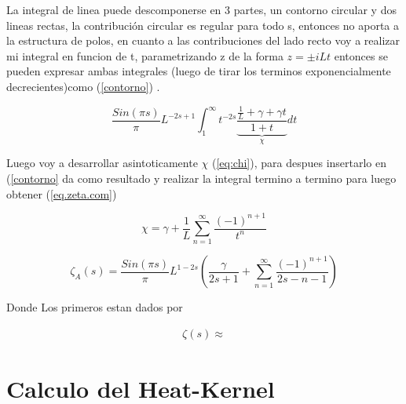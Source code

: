 La integral de linea puede descomponerse en 3 partes, un contorno circular y dos lineas rectas, la contribución circular es regular para todo s, entonces no aporta a la estructura de polos, en cuanto a las contribuciones del lado recto voy a realizar mi integral en funcion de t, parametrizando z de la forma $z = \pm i L t$ entonces se pueden expresar ambas integrales (luego de tirar los terminos exponencialmente decrecientes)como  (\ref{contorno}) .

\begin{equation}
    \frac{Sin(\pi s)}{ \pi } L ^{-2s+1}
    \int _1 ^{\infty} 
    t ^{-2s}
    \underbrace
    {
	\frac{ \frac{1}{L} + \gamma + \gamma t}
	{1+ t}
	} _{\chi}
    dt 
\label{contorno}
\end{equation}

Luego voy a desarrollar asintoticamente  $\chi$  (\ref{eq:chi}), para despues insertarlo en (\ref{contorno} da como resultado y realizar la integral termino a termino para luego obtener (\ref{eq.zeta.com})

\begin{equation}
    \chi = \gamma + \frac{1}{L} \sum _{n=1} ^{\infty} \frac{(-1) ^{n+1}}{t ^n}
\label{eq:chi}
\end{equation}

\begin{equation}
    \zeta _A (s) = 
    \frac{Sin(\pi s)}{\pi} L ^{1-2s}
    \left(
    \frac{\gamma}{2s+1} + 
    \sum _{n=1} ^{\infty}
    \frac{(-1) ^{n+1}}{2s-n-1}
    \right)
\label{eq.zeta.com}
\end{equation}

Donde Los primeros estan dados por 

\begin{equation}
\begin{array}{c}

\zeta(s) \approx 

\end{array}
\end{equation}

\section{Calculo del Heat-Kernel}
